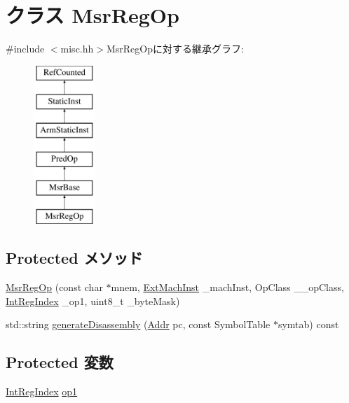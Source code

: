 \hypertarget{classMsrRegOp}{
\section{クラス MsrRegOp}
\label{classMsrRegOp}
}


{\ttfamily \#include $<$misc.hh$>$}MsrRegOpに対する継承グラフ:\begin{figure}[H]
\begin{center}
\leavevmode
\includegraphics[height=6cm]{classMsrRegOp}
\end{center}
\end{figure}
\subsection*{Protected メソッド}
\begin{DoxyCompactItemize}
\item 
\hyperlink{classMsrRegOp_a6f67414a0b4d76e9793c7714cccd9890}{MsrRegOp} (const char $\ast$mnem, \hyperlink{classStaticInst_a5605d4fc727eae9e595325c90c0ec108}{ExtMachInst} \_\-machInst, OpClass \_\-\_\-opClass, \hyperlink{namespaceArmISA_ae64680ba9fb526106829d6bf92fc791b}{IntRegIndex} \_\-op1, uint8\_\-t \_\-byteMask)
\item 
std::string \hyperlink{classMsrRegOp_a95d323a22a5f07e14d6b4c9385a91896}{generateDisassembly} (\hyperlink{classm5_1_1params_1_1Addr}{Addr} pc, const SymbolTable $\ast$symtab) const 
\end{DoxyCompactItemize}
\subsection*{Protected 変数}
\begin{DoxyCompactItemize}
\item 
\hyperlink{namespaceArmISA_ae64680ba9fb526106829d6bf92fc791b}{IntRegIndex} \hyperlink{classMsrRegOp_a4c465c43ad568f8bcf8ae71480e9cfea}{op1}
\end{DoxyCompactItemize}


